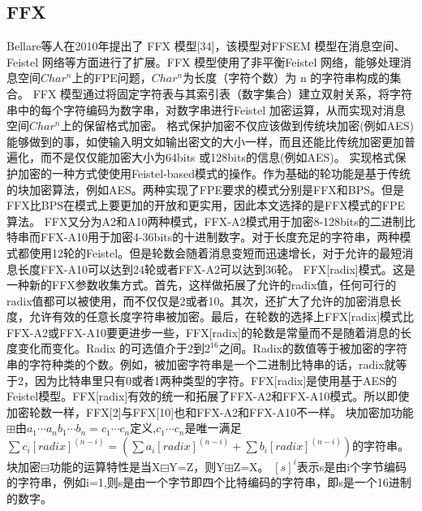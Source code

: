 \subsection{FFX}
Bellare等人在2010年提出了 FFX 模型[34]\cite{black2002ciphers}，该模型对FFSEM 模型在消息空间、Feistel 网络等方面进行了扩展。FFX 模型使用了非平衡Feistel 网络，能够处理消息空间$Char^n$上的FPE问题，$Char^n$为长度（字符个数）为 n 的字符串构成的集合。 
FFX 模型通过将固定字符表与其索引表（数字集合）建立双射关系，将字符串中的每个字符编码为数字串，对数字串进行Feistel 加密运算，从而实现对消息空间$Char^n$上的保留格式加密。
格式保护加密不仅应该做到传统块加密(例如AES)能够做到的事，如使输入明文如输出密文的大小一样，而且还能比传统加密更加普遍化，而不是仅仅能加密大小为64bits 或128bits的信息(例如AES)。
实现格式保护加密的一种方式使使用Feistel-based模式的操作。作为基础的轮功能是基于传统的块加密算法，例如AES。两种实现了FPE要求的模式分别是FFX和BPS。但是FFX比BPS在模式上要更加的开放和更实用，因此本文选择的是FFX模式的FPE算法。
FFX又分为A2和A10两种模式，FFX-A2模式用于加密8-128bits的二进制比特串而FFX-A10用于加密4-36bits的十进制数字。对于长度充足的字符串，两种模式都使用12轮的Feistel。但是轮数会随着消息变短而迅速增长，对于允许的最短消息长度FFX-A10可以达到24轮或者FFX-A2可以达到36轮。
FFX[radix]模式。这是一种新的FFX参数收集方式。首先，这样做拓展了允许的radix值，任何可行的radix值都可以被使用，而不仅仅是2或者10。其次，还扩大了允许的加密消息长度，允许有效的任意长度字符串被加密。最后，在轮数的选择上FFX[radix]模式比FFX-A2或FFX-A10要更进步一些，FFX[radix]的轮数是常量而不是随着消息的长度变化而变化。Radix 的可选值介于2到$2^{16}$之间。Radix的数值等于被加密的字符串的字符种类的个数。例如，被加密字符串是一个二进制比特串的话，radix就等于2，因为比特串里只有0或者1两种类型的字符。FFX[radix]是使用基于AES的Feistel模型。FFX[radix]有效的统一和拓展了FFX-A2和FFX-A10模式。所以即使加密轮数一样，FFX[2]与FFX[10]也和FFX-A2和FFX-A10不一样。
块加密加功能$\boxplus$由$a_1\cdots a_n $\boxplus$ b_1\cdots b_n = c_1\cdots c_n$定义,$c_1\cdots c_n$是唯一满足\newline$\sum c_i [radix]^{(n-i)}=(\sum a_i [radix]^{(n-i)}+ \sum b_i [radix]^{(n-i)})$的字符串。
块加密$\boxminus$功能的运算特性是当X$\boxminus$Y=Z，则Y$\boxplus$Z=X。
$[s]^i$表示s是由i个字节编码的字符串，例如i=1,则s是由一个字节即四个比特编码的字符串，即s是一个16进制的数字。




